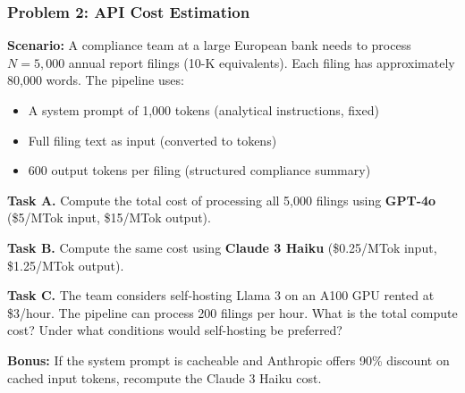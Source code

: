 \documentclass[9pt,t]{beamer}
\begin{document}
\begin{frame}
\frametitle{Problem 2: API Cost Estimation}

\textbf{Scenario:} A compliance team at a large European bank needs to process
$N = 5{,}000$ annual report filings (10-K equivalents). Each filing has
approximately 80,000 words. The pipeline uses:
\begin{itemize}
  \item A system prompt of 1,000 tokens (analytical instructions, fixed)
  \item Full filing text as input (converted to tokens)
  \item 600 output tokens per filing (structured compliance summary)
\end{itemize}

\medskip
\textbf{Task A.} Compute the total cost of processing all 5,000 filings using
\textbf{GPT-4o} (\$5/MTok input, \$15/MTok output).

\medskip
\textbf{Task B.} Compute the same cost using \textbf{Claude 3 Haiku}
(\$0.25/MTok input, \$1.25/MTok output).

\medskip
\textbf{Task C.} The team considers self-hosting Llama 3 on an A100 GPU rented
at \$3/hour. The pipeline can process 200 filings per hour. What is the total
compute cost? Under what conditions would self-hosting be preferred?

\medskip
\textbf{Bonus:} If the system prompt is cacheable and Anthropic offers 90\% discount
on cached input tokens, recompute the Claude 3 Haiku cost.
\end{frame}
\end{document}
